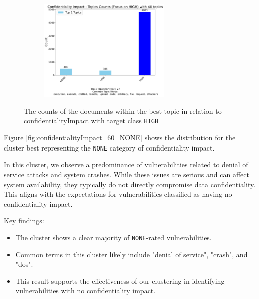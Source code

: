 \documentclass[12pt]{article}
\begin{document}
\begin{figure}
	\ContinuedFloat
	\centering
	\begin{subfigure}{\textwidth}
		\centering
		\includegraphics[width=0.7\textwidth]{figures/confidentialityImpact/merged_top_k_topics_category_focus_counts_confidentialityImpact_HIGH_k1.pdf}
	\end{subfigure}

	\caption{The counts of the documents within the best topic in relation to confidentialityImpact with target class \texttt{HIGH}}
	\label{fig:confidentialityImpact_60_HIGH}
\end{figure}

Figure \ref{fig:confidentialityImpact_60_NONE} shows the distribution for the cluster best representing
the \texttt{NONE} category of confidentiality impact.


In this cluster, we observe a predominance of vulnerabilities related to denial of service attacks
and system crashes. While these issues are serious and can affect system availability, they
typically do not directly compromise data confidentiality. This aligns with the expectations for
vulnerabilities classified as having no confidentiality impact.

Key findings:
\begin{itemize}

	\item The cluster shows a clear majority of \texttt{NONE}-rated vulnerabilities.

	\item Common terms in this cluster likely include "denial of service", "crash", and
	      "dos".

	\item This result supports the effectiveness of our clustering in identifying vulnerabilities
	      with no confidentiality impact.

\end{itemize}
\end{document}
